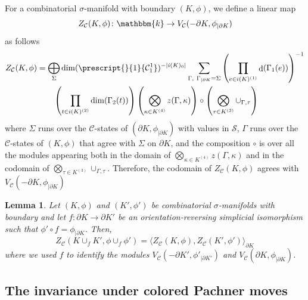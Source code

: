 \documentclass[a4paper, oneside]{amsart}
\DeclareMathOperator{\wdim}{d}
\numberwithin{equation}{subsection}
\theoremstyle{referencedlemma}
\theoremstyle{plain} %
\newtheorem{lem}[equation]{Lemma}
\theoremstyle{remark}
\begin{document}
For a combinatorial $\sigma$-manifold with boundary $(K,\phi)$, we define a linear map $$Z_\mathcal{C}(K,\phi) \colon \mathbbm{k}\to V_\mathcal{C}(-\partial K, \phi_{\vert \partial K})$$ as follows
\begin{align*}
Z_\mathcal{C}(K,\phi) & = \bigoplus_{\Sigma} \dim(\prescript{}{1}{\mathcal{C}_1^1})^{-\lvert i(K)_0\rvert}\sum_{\Gamma, \ \Gamma_{\vert \partial K} = \Sigma} \left(\prod_{e\in i(K)^{(1)}}\wdim(\Gamma_1(e)) \right)^{-1}\\
& \quad \quad \left( \prod_{t\in i(K)^{(2)}}\dim(\Gamma_2(t)) \right)\left( \bigotimes_{\kappa \in K^{(4)}}z(\Gamma, \kappa) \right)\circ \left(\bigotimes_{\tau \in K^{(3)}} \cup_{\Gamma, \tau}  \right)
\end{align*}
where $\Sigma$ runs over the $\mathcal{C}$-states of $(\partial K, \phi_{\vert \partial K})$ with values in $\mathcal{S}$,  $\Gamma$ runs over the $\mathcal{C}$-states of $(K,\phi )$ that agree with $\Sigma$ on $\partial K$, and the composition $\circ$ is over all the modules appearing both in the domain of $ \bigotimes_{\kappa \in K^{(4)}}z(\Gamma, \kappa)$ and in the codomain of $\bigotimes_{\tau \in K^{(3)}} \cup_{\Gamma, \tau} $. Therefore, the codomain of $Z_\mathcal{C}(K, \phi)$ agrees with $V_\mathcal{C}(-\partial K, \phi_{\vert \partial K})$



\begin{lem}\label{lemmaboundarysum}
Let $(K,\phi)$ and $(K',\phi')$ be combinatorial $\sigma$-manifolds with boundary and let $f\colon \partial K \to \partial K'$ be an orientation-reversing simplicial isomorphism such that $\phi'\circ f = \phi_{\vert \partial K}$.  Then,
\begin{equation*}
Z_\mathcal{C}(K\cup_f K', \phi\cup_f \phi') = \langle Z_\mathcal{C}(K, \phi) , Z_\mathcal{C} (K', \phi')\rangle_{\partial K}
\end{equation*}
where we used $f$ to identify the modules $V_\mathcal{C}(-\partial K', \phi'_{\vert \partial K'})$ and $V_\mathcal{C}(\partial K, \phi_{\vert \partial K})$. 
\end{lem}

\subsection{The invariance under colored Pachner moves}\label{Invariance triangulation}
\end{document}
